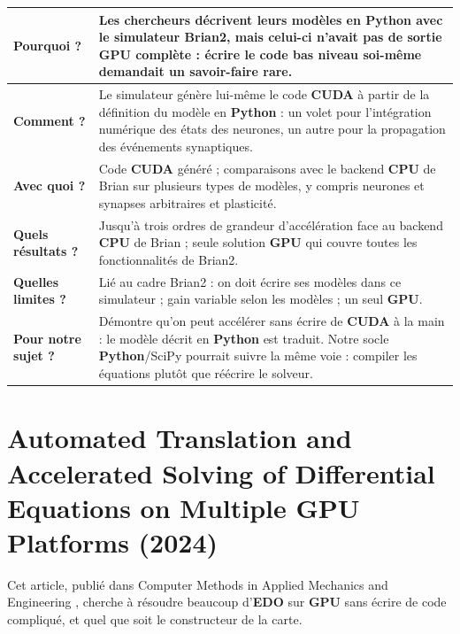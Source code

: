 \documentclass{report}
\begin{document}
\medskip
\begin{tabular}{|p{3.2cm}|p{11.2cm}|}
\hline
\textbf{Pourquoi ?} & Les chercheurs décrivent leurs modèles en \textbf{Python} avec le simulateur Brian2, mais celui-ci n'avait pas de sortie \textbf{GPU} complète : écrire le code bas niveau soi-même demandait un savoir-faire rare. \\ \hline
\textbf{Comment ?} & Le simulateur génère lui-même le code \textbf{CUDA} à partir de la définition du modèle en \textbf{Python} : un volet pour l'intégration numérique des états des neurones, un autre pour la propagation des événements synaptiques. \\ \hline
\textbf{Avec quoi ?} & Code \textbf{CUDA} généré ; comparaisons avec le backend \textbf{CPU} de Brian sur plusieurs types de modèles, y compris neurones et synapses arbitraires et plasticité. \\ \hline
\textbf{Quels résultats ?} & Jusqu'à trois ordres de grandeur d'accélération face au backend \textbf{CPU} de Brian ; seule solution \textbf{GPU} qui couvre toutes les fonctionnalités de Brian2. \\ \hline
\textbf{Quelles limites ?} & Lié au cadre Brian2 : on doit écrire ses modèles dans ce simulateur ; gain variable selon les modèles ; un seul \textbf{GPU}. \\ \hline
\textbf{Pour notre sujet ?} & Démontre qu'on peut accélérer sans écrire de \textbf{CUDA} à la main : le modèle décrit en \textbf{Python} est traduit. Notre socle \textbf{Python}/SciPy pourrait suivre la même voie : compiler les équations plutôt que réécrire le solveur. \\ \hline
\end{tabular}
\newpage
\section{Automated Translation and Accelerated Solving of Differential Equations on Multiple GPU Platforms (2024)}

Cet article, publié dans Computer Methods in Applied Mechanics and Engineering \cite{utkarsh2024}, cherche à résoudre beaucoup d'\textbf{EDO} sur \textbf{GPU} sans écrire de code compliqué, et quel que soit le constructeur de la carte.
\end{document}
